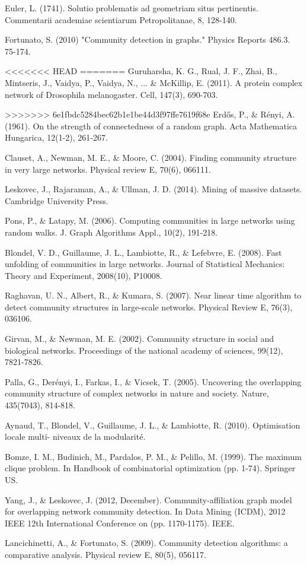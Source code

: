 \documentclass[10pt]{article}
\begin{document}
\begin{thebibliography}{40}

 Euler, L. (1741). Solutio problematis ad geometriam situs pertinentis. Commentarii academiae scientiarum Petropolitanae, 8, 128-140.

 Fortunato, S. (2010) "Community detection in graphs." Physics Reports 486.3. 75-174.

<<<<<<< HEAD
=======
 Guruharsha, K. G., Rual, J. F., Zhai, B., Mintseris, J., Vaidya, P., Vaidya, N., ... \& McKillip, E. (2011). A protein complex network of Drosophila melanogaster. Cell, 147(3), 690-703.

>>>>>>> 6e1fbdc5284bec62b1e1be44d3f97ffe7619f68e
 Erdős, P., \& Rényi, A. (1961). On the strength of connectedness of a random graph. Acta Mathematica Hungarica, 12(1-2), 261-267.

 Clauset, A., Newman, M. E., \& Moore, C. (2004). Finding community structure in very large networks. Physical review E, 70(6), 066111.

 Leskovec, J., Rajaraman, A., \& Ullman, J. D. (2014). Mining of massive datasets. Cambridge University Press.

 Pons, P., \& Latapy, M. (2006). Computing communities in large networks using random walks. J. Graph Algorithms Appl., 10(2), 191-218.

 Blondel, V. D., Guillaume, J. L., Lambiotte, R., \& Lefebvre, E. (2008). Fast unfolding of communities in large networks. Journal of Statistical Mechanics: Theory and Experiment, 2008(10), P10008.

 Raghavan, U. N., Albert, R., \& Kumara, S. (2007). Near linear time algorithm to detect community structures in large-scale networks. Physical Review E, 76(3), 036106.

 Girvan, M., \& Newman, M. E. (2002). Community structure in social and biological networks. Proceedings of the national academy of sciences, 99(12), 7821-7826.

 Palla, G., Derényi, I., Farkas, I., \& Vicsek, T. (2005). Uncovering the overlapping community structure of complex networks in nature and society. Nature, 435(7043), 814-818.

 Aynaud, T., Blondel, V., Guillaume, J. L., \& Lambiotte, R. (2010). Optimisation locale multi- niveaux de la modularité.

 Bomze, I. M., Budinich, M., Pardalos, P. M., \& Pelillo, M. (1999). The maximum clique problem. In Handbook of combinatorial optimization (pp. 1-74). Springer US.

 Yang, J., \& Leskovec, J. (2012, December). Community-affiliation graph model for overlapping network community detection. In Data Mining (ICDM), 2012 IEEE 12th International Conference on (pp. 1170-1175). IEEE.

 Lancichinetti, A., \& Fortunato, S. (2009). Community detection algorithms: a comparative analysis. Physical review E, 80(5), 056117.

\end{thebibliography}
\end{document}
